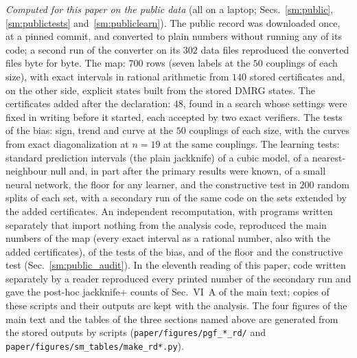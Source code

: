 \documentclass[aps,prx,onecolumn,10pt,nofootinbib,longbibliography,floatfix]{revtex4-2}
\theoremstyle{remark}
\begin{document}
\emph{Computed for this paper on the public data} (all on a laptop; Secs.~\ref{sm:public}, \ref{sm:publictests}
and~\ref{sm:publiclearn}). The public record was downloaded once, at a pinned commit, and converted to plain numbers
without running any of its code; a second run of the converter on its $302$ data files reproduced the converted %
files byte for byte. The map: $700$ rows (seven labels at the $50$ couplings of each size), with exact intervals in %
rational arithmetic from $140$ stored certificates and, on the other side, explicit states built from the stored %
DMRG states. The certificates added after the declaration: $48$, found in a search whose settings were fixed in %
writing before it started, each accepted by two exact verifiers. The tests of the bias: sign, trend and curve at the
$50$ couplings of each size, with the curves from exact diagonalization at $n=19$ at the same couplings. The %
learning tests: standard prediction intervals (the plain jackknife) of a cubic model, of a nearest-neighbour null
and, in part after the primary results were known, of a small neural network, the floor for any
learner, and the constructive test in $200$ random splits of each set, with a secondary run of the same code on %
the sets extended by the added certificates. An independent recomputation, with programs written separately that
import nothing from the analysis code, reproduced the main numbers of the map (every exact interval as a rational
number, also with the added certificates), of the tests of the bias, and of the floor and the constructive test
(Sec.~\ref{sm:public_audit}). In the eleventh reading of this paper, code written separately by a reader
reproduced every printed number of the secondary run and gave the post-hoc jackknife+ counts of %
Sec.~VI~A of the main text; copies of these scripts and their outputs are kept with the analysis. The four
figures of the main text and the tables of the three sections named above
are generated from the stored outputs by scripts (\texttt{paper/figures/pgf\_*\_rd/} and
\texttt{paper/figures/sm\_tables/make\_rd*.py}).
\end{document}
